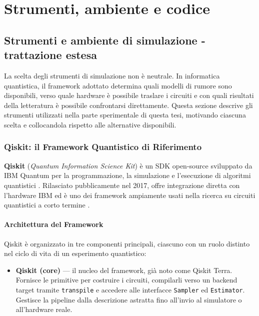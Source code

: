 \chapter{Strumenti, ambiente e codice}
\captionsetup[figure]{font=small,labelfont=bf}
\label{app:strumentiecodice}

\section{Strumenti e ambiente di simulazione - trattazione estesa}
\label{app:strumenti}
\begin{onehalfspace}

La scelta degli strumenti di simulazione non è neutrale. In informatica quantistica, il framework adottato determina quali modelli di rumore sono disponibili, verso quale hardware è possibile traslare i circuiti e con quali risultati della letteratura è possibile confrontarsi direttamente. Questa sezione descrive gli strumenti utilizzati nella parte sperimentale di questa tesi, motivando ciascuna scelta e collocandola rispetto alle alternative disponibili.

\subsection{Qiskit: il Framework Quantistico di Riferimento}
\label{sec:qiskit}

\textbf{Qiskit} (\textit{Quantum Information Science Kit}) è un \ac{SDK} open-source sviluppato da \ac{IBM} Quantum per la programmazione, la simulazione e l'esecuzione di algoritmi quantistici \cite{qiskit2023}. Rilasciato pubblicamente nel 2017, offre integrazione diretta con l'hardware \ac{IBM} ed è uno dei framework ampiamente usati nella ricerca su circuiti quantistici a corto termine \cite{skosana2021, shor_hpec2023}.

\subsubsection{Architettura del Framework}

Qiskit è organizzato in tre componenti principali, ciascuno con un ruolo distinto nel ciclo di vita di un esperimento quantistico:

\begin{itemize}

    \item \textbf{Qiskit (core)} — il nucleo del framework, già noto come Qiskit Terra. Fornisce le primitive per costruire i circuiti, compilarli verso un backend target tramite \texttt{transpile} e accedere alle interfacce \texttt{Sampler} ed \texttt{Estimator}. Gestisce la pipeline dalla descrizione astratta fino all'invio al simulatore o all'hardware reale.


\end{itemize}
\end{onehalfspace}
